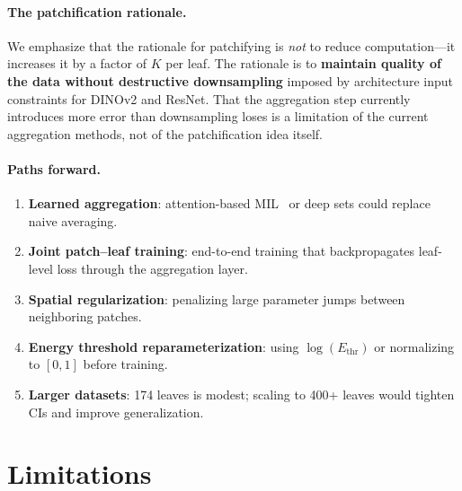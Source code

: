 \documentclass[11pt]{article}
\begin{document}
\paragraph{The patchification rationale.}
We emphasize that the rationale for patchifying is \emph{not} to reduce computation---it increases it by a factor of $K$ per leaf.  The rationale is to \textbf{maintain quality of the data without destructive downsampling} imposed by architecture input constraints for DINOv2 and ResNet.  That the aggregation step currently introduces more error than downsampling loses is a limitation of the current aggregation methods, not of the patchification idea itself.

\paragraph{Paths forward.}
\begin{enumerate}[leftmargin=1.5em,itemsep=1pt]
\item \textbf{Learned aggregation}: attention-based MIL~\citep{ilse2018attention} or deep sets could replace naive averaging.
\item \textbf{Joint patch--leaf training}: end-to-end training that backpropagates leaf-level loss through the aggregation layer.
\item \textbf{Spatial regularization}: penalizing large parameter jumps between neighboring patches.
\item \textbf{Energy threshold reparameterization}: using $\log(E_{\mathrm{thr}})$ or normalizing to $[0,1]$ before training.
\item \textbf{Larger datasets}: 174 leaves is modest; scaling to 400+ leaves would tighten CIs and improve generalization.
\end{enumerate}


\section{Limitations}
\label{sec:limitations}
\end{document}
